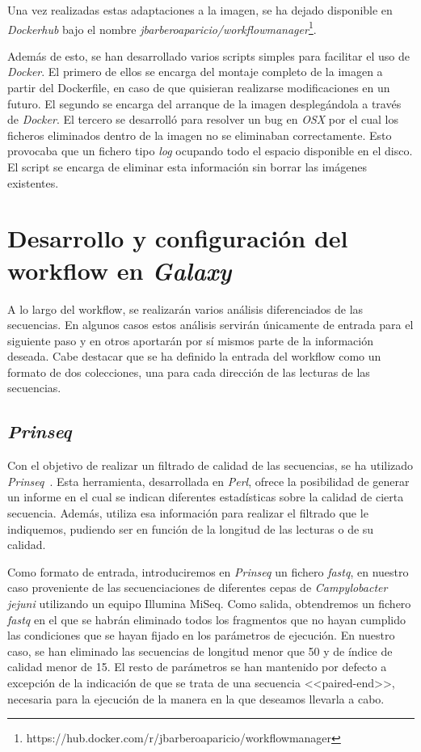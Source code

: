 Una vez realizadas estas adaptaciones a la imagen, se ha dejado disponible en \textit{Dockerhub} bajo el nombre \textit{jbarberoaparicio/workflowmanager}\footnote{https://hub.docker.com/r/jbarberoaparicio/workflowmanager}. 

Además de esto, se han desarrollado varios scripts simples para facilitar el uso de \textit{Docker}. El primero de ellos se encarga del montaje completo de la imagen a partir del Dockerfile, en caso de que quisieran realizarse modificaciones en un futuro. El segundo se encarga del arranque de la imagen desplegándola a través de \textit{Docker}. El tercero se desarrolló para resolver un bug en \textit{OSX} por el cual los ficheros eliminados dentro de la imagen no se eliminaban correctamente. Esto provocaba que un fichero tipo \textit{log} ocupando todo el espacio disponible en el disco. El script se encarga de eliminar esta información sin borrar las imágenes existentes.


\section{Desarrollo y configuración del workflow en \itshape{Galaxy}}
A lo largo del workflow, se realizarán varios análisis diferenciados de las secuencias. En algunos casos estos análisis servirán  únicamente de entrada para el siguiente paso y en otros aportarán por sí mismos parte de la información deseada. 
Cabe destacar que se ha definido la entrada del workflow como un formato de dos colecciones, una para cada dirección de las lecturas de las secuencias. 

\subsection{\itshape{Prinseq}}
Con el objetivo de realizar un filtrado de calidad de las secuencias, se ha utilizado \textit{Prinseq}~\cite{schmieder_prinseq}. Esta herramienta, desarrollada en \textit{Perl}, ofrece la posibilidad de generar un informe en el cual se indican diferentes estadísticas sobre la calidad de cierta secuencia. Además, utiliza esa información para realizar el filtrado que le indiquemos, pudiendo ser en función de la longitud de las lecturas o de su calidad.

Como formato de entrada, introduciremos en \textit{Prinseq} un fichero \textit{fastq}, en nuestro caso proveniente de las secuenciaciones de diferentes cepas de \textit{Campylobacter jejuni} utilizando un equipo Illumina MiSeq. Como salida, obtendremos un fichero \textit{fastq} en el que se habrán eliminado todos los fragmentos que no hayan cumplido las condiciones que se hayan fijado en los parámetros de ejecución. En nuestro caso, se han eliminado las secuencias de longitud menor que 50 y de índice de calidad menor de 15. El resto de parámetros se han mantenido por defecto a excepción de la indicación de que se trata de una secuencia <<paired-end>>, necesaria para la ejecución de la manera en la que deseamos llevarla a cabo.

